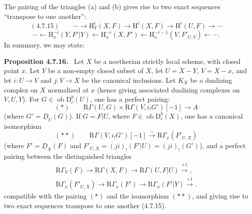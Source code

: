 \documentclass[11pt]{article}
\newenvironment{statement}[1]{\par\medskip\noindent\textbf{#1.}\ }{\par\medskip}
\renewcommand{\H}{\mathrm{H}}
\newcommand{\R}{\mathrm{R}}
\newcommand{\D}{\mathrm{D}}
\newcommand{\ob}{\operatorname{ob}}
\providecommand{\ob}{\operatorname{ob}}
\providecommand{\R}{\mathrm R}
\begin{document}
The pairing of the triangles (a) and (b) gives rise to two exact sequences ``transpose to one another'':
\[
(4.7.15)\qquad \cdots\longrightarrow \H_Y^i(X,F)\longrightarrow\H^i(X,F)\longrightarrow\H^i(U,F)\longrightarrow\cdots
\]
\[
\cdots\longleftarrow \H_x^{-i}(Y,F'|Y)\longleftarrow\H_x^{-i}(X,F')\longleftarrow\H_x^{-i-1}(V,F'_{U,V})\longleftarrow\cdots.
\]
In summary, we may state:

\begin{statement}{Proposition 4.7.16}
Let $X$ be a noetherian strictly local scheme, with closed point $x$. Let $Y$ be a non-empty closed subset of $X$, let $U=X-Y$, $V=X-x$, and let $i:U\to V$ and $j:V\to X$ be the canonical inclusions. Let $K_X$ be a dualizing complex on $X$ normalized at $x$ (hence giving associated dualizing complexes on $V,U,Y$). For $G\in\ob\D_c^b(U)$, one has a perfect pairing:
\[
(*)\qquad \R\Gamma(U,G)\times\R\Gamma(V,i_!G')[-1]\longrightarrow A
\]
(where $G'=\underline{D}_U(G)$). If $G=F|U$, where $F\in\ob\D_c^b(X)$, one has a canonical isomorphism
\[
(**)\qquad \R\Gamma(V,i_!G')[-1]\xrightarrow{\sim}\R\Gamma_x(F'_{U,X})
\]
(where $F'=\underline{D}_X(F)$ and $F'_{U,X}=(ji)_!(F'|U)=(ji)_!(G')$), and a perfect pairing between the distinguished triangles
\[
\begin{gathered}
\R\Gamma_Y(F)\longrightarrow \R\Gamma(X,F)\longrightarrow \R\Gamma(U,F|U)\xrightarrow{+1},\\
\R\Gamma_x(F'_{U,X})\longrightarrow \R\Gamma_x(F')\longrightarrow \R\Gamma_x(F'|Y)\xrightarrow{+1}.
\end{gathered}
\]
compatible with the pairing $(*)$ and the isomorphism $(**)$, and giving rise to two exact sequences transpose to one another (4.7.15).
\end{statement}
\end{document}
